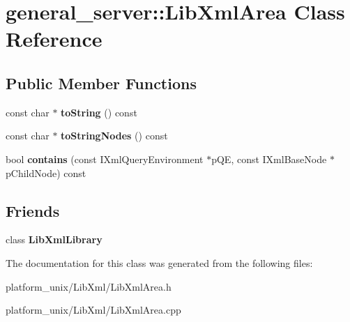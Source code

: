 \hypertarget{classgeneral__server_1_1LibXmlArea}{\section{general\-\_\-server\-:\-:\-Lib\-Xml\-Area \-Class \-Reference}
\label{classgeneral__server_1_1LibXmlArea}
}
\subsection*{\-Public \-Member \-Functions}
\begin{DoxyCompactItemize}
\item 
\hypertarget{classgeneral__server_1_1LibXmlArea_a352a736807b3722907504761b9149362}{const char $\ast$ {\bfseries to\-String} () const }\label{classgeneral__server_1_1LibXmlArea_a352a736807b3722907504761b9149362}

\item 
\hypertarget{classgeneral__server_1_1LibXmlArea_aa2de9fc9dbe774621b8423921f3d75b8}{const char $\ast$ {\bfseries to\-String\-Nodes} () const }\label{classgeneral__server_1_1LibXmlArea_aa2de9fc9dbe774621b8423921f3d75b8}

\item 
\hypertarget{classgeneral__server_1_1LibXmlArea_a3a3169f424867d175100c1bc9c277d0b}{bool {\bfseries contains} (const \-I\-Xml\-Query\-Environment $\ast$p\-Q\-E, const \-I\-Xml\-Base\-Node $\ast$p\-Child\-Node) const }\label{classgeneral__server_1_1LibXmlArea_a3a3169f424867d175100c1bc9c277d0b}

\end{DoxyCompactItemize}
\subsection*{\-Friends}
\begin{DoxyCompactItemize}
\item 
\hypertarget{classgeneral__server_1_1LibXmlArea_ab76a8c8b514e08e13c811de729a94ce4}{class {\bfseries \-Lib\-Xml\-Library}}\label{classgeneral__server_1_1LibXmlArea_ab76a8c8b514e08e13c811de729a94ce4}

\end{DoxyCompactItemize}


\-The documentation for this class was generated from the following files\-:\begin{DoxyCompactItemize}
\item 
platform\-\_\-unix/\-Lib\-Xml/\-Lib\-Xml\-Area.\-h\item 
platform\-\_\-unix/\-Lib\-Xml/\-Lib\-Xml\-Area.\-cpp\end{DoxyCompactItemize}
